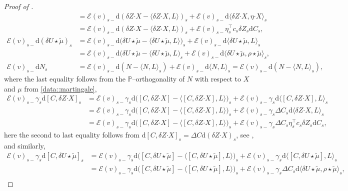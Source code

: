 \documentclass[10pt]{article} %
\newcommand\cE{\mathcal E}
\def \P{\mathbb{P}}
\newcommand{\bcdot}{\boldsymbol{\cdot}}
\def\d{\mathrm{d}}
\begin{document}
\begin{proof}[Proof of ]
\begin{align*}
		&= \cE(v)_{s-}\d (\delta Z \bcdot X - \langle \delta Z \bcdot X,L \rangle)_s + \cE(v)_{s-}\d\langle \delta Z \bcdot X, \eta \bcdot X \rangle_s \\
		&= \cE(v)_{s-}\d (\delta Z \bcdot X - \langle \delta Z\bcdot X,L \rangle)_s + \cE(v)_{s-} \eta^\top_s c_s\delta Z_s \d C_s,\\
		\cE(v)_{s-}\d(\delta U \star \tilde\mu)_s &= \cE(v)_{s-}\d\big(\delta U \star \tilde\mu - \langle \delta U \star\tilde\mu,L\rangle\big)_s + \cE(v)_{s-}\d \langle \delta U \star\tilde\mu,L\rangle_s \\
		&= \cE(v)_{s-}\d\big(\delta U \star \tilde\mu - \langle \delta U \star\tilde\mu,L\big)_s + \cE(v)_{s-}\d \langle \delta U \star\tilde\mu,\rho\star\tilde\mu\rangle_s,\\
		\cE(v)_{s-}\d N_s &= \cE(v)_{s-}\d(N-\langle N, L \rangle_s) + \cE(v)_{s-}\d\langle N,L\rangle_s = \cE(v)_{s-}\d(N-\langle N, L \rangle_s),
	\end{align*}
	where the last equality follows from the $\P$--orthogonality of $N$ with respect to $X$ and $\mu$ from \ref{data::martingale},
	\begin{align*}
		\cE(v)_{s-}\gamma_s \d[C,\delta Z \bcdot X]_s 
		&= \cE(v)_{s-}\gamma_s \d\big([C,\delta Z \bcdot X]-\big\langle [C,\delta Z \bcdot X],L \big\rangle\big)_s + \cE(v)_{s-}\gamma_s \d\big\langle [C,\delta Z \bcdot X],L \big\rangle_s \\
		&= \cE(v)_{s-}\gamma_s \d\big([C,\delta Z \bcdot X]-\big\langle [C,\delta Z \bcdot X],L \big\rangle\big)_s + \cE(v)_{s-}\gamma_s \Delta C_s \d\langle \delta Z \bcdot X,L \rangle_s \\
		&= \cE(v)_{s-}\gamma_s \d\big([C,\delta Z \bcdot X]-\big\langle [C,\delta Z \bcdot X],L \big\rangle\big)_s + \cE(v)_{s-} \gamma_s \Delta C_s \eta_s^\top c_s \delta Z_s \d C_s,
	\end{align*}
	here the second to last equality follows from $\d [C,\delta Z \bcdot X]_s = \Delta C \d(\delta Z \bcdot X)_s$, see \cite[Proposition I.4.49]{jacod2003limit}, and similarly,
	\begin{align*}
		\cE(v)_{s-}\gamma_s \d[C,\delta U \star\tilde\mu]_s 
		&= \cE(v)_{s-}\gamma_s\d\big([C,\delta U \star\tilde\mu]-\big\langle [C,\delta U \star\tilde\mu],L \big\rangle\big)_s + \cE(v)_{s-} \gamma_s \d\big\langle [C,\delta U \star\tilde\mu],L \big\rangle_s \\
		&= \cE(v)_{s-}\gamma_s \d\big([C,\delta U \star\tilde\mu]-\big\langle [C,\delta U \star\tilde\mu],L \big\rangle\big)_s + \cE(v)_{s-}\gamma_s \Delta C_s \d\langle \delta U \star\tilde\mu,\rho\star\tilde\mu \rangle_s,\\

\end{align*}
\end{proof}
\end{document}
